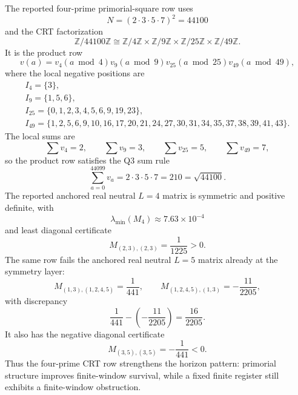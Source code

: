 \begin{principle}
\label{prin:innovation-input-four-prime-crt-witness-ledger}
The reported four-prime primorial-square row uses
$$
N=(2\cdot3\cdot5\cdot7)^2=44100
$$
and the CRT factorization
$$
\mathbb Z/44100\mathbb Z
\cong
\mathbb Z/4\mathbb Z
\times
\mathbb Z/9\mathbb Z
\times
\mathbb Z/25\mathbb Z
\times
\mathbb Z/49\mathbb Z.
$$
It is the product row
$$
v(a)
=
v_4(a\bmod4)
v_9(a\bmod9)
v_{25}(a\bmod25)
v_{49}(a\bmod49),
$$
where the local negative positions are
$$
\begin{gathered}
I_4=\{3\},\\
I_9=\{1,5,6\},\\
I_{25}=\{0,1,2,3,4,5,6,9,19,23\},\\
I_{49}=\{1,2,5,6,9,10,16,17,20,21,24,
27,30,31,34,35,37,38,39,41,43\}.
\end{gathered}
$$
The local sums are
$$
\sum v_4=2,
\qquad
\sum v_9=3,
\qquad
\sum v_{25}=5,
\qquad
\sum v_{49}=7,
$$
so the product row satisfies the Q3 sum rule
$$
\sum_{a=0}^{44099}v_a
=
2\cdot3\cdot5\cdot7
=
210
=
\sqrt{44100}.
$$
The reported anchored real neutral $L=4$ matrix is symmetric and positive
definite, with
$$
\lambda_{\min}(M_4)\approx7.63\times10^{-4}
$$
and least diagonal certificate
$$
M_{(2,3),(2,3)}=\frac1{1225}>0.
$$
The same row fails the anchored real neutral $L=5$ matrix already at the
symmetry layer:
$$
M_{(1,3),(1,2,4,5)}=\frac1{441},
\qquad
M_{(1,2,4,5),(1,3)}=-\frac{11}{2205},
$$
with discrepancy
$$
\frac1{441}-\left(-\frac{11}{2205}\right)
=
\frac{16}{2205}.
$$
It also has the negative diagonal certificate
$$
M_{(3,5),(3,5)}=-\frac1{441}<0.
$$
Thus the four-prime CRT row strengthens the horizon pattern: primorial
structure improves finite-window survival, while a fixed finite register
still exhibits a finite-window obstruction.
\end{principle}

